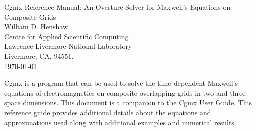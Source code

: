 \documentclass{article}
\begin{document}


\def\ud     {{    U}}
\def\pd     {{    P}}

\newcommand{\mbar}{\bar{m}}
\newcommand{\Rbar}{\bar{R}}
\newcommand{\Ru}{R_u}         %
\newcommand{\Div}{\grad\cdot}
\newcommand{\tauv}{\boldsymbol{\tau}}
\newcommand{\sumi}{\sum_{i=1}^n}
\newcommand{\dt}{{\Delta t}}
\newcommand{\dx}{{\Delta x}}
\newcommand{\eps}{\epsilon}

\newcommand{\Ic}{{\mathcal I}}
\newcommand{\Lc}{{\mathcal L}}
\newcommand{\Oc}{{\mathcal O}}

\baselineskip
\begin{flushleft}
{\Large
Cgmx Reference Manual: An {Overture} Solver for {Maxwell}'s Equations on Composite Grids\\
}
\vspace{2\baselineskip}
William D. Henshaw  \\
Centre for Applied Scientific Computing  \\
Lawrence Livermore National Laboratory      \\
Livermore, CA, 94551.  \\
\vspace{\baselineskip}
\today\\
\vspace{\baselineskip}

\vspace{4\baselineskip}


Cgmx is a program that can be used to solve the time-dependent Maxwell's equations
of electromagnetics on composite overlapping grids in two and three space
dimensions. This document is a companion to the Cgmx User Guide. 
This reference guide provides additional details about the equations and approximations used along
with additional examples and numerical results.

\end{flushleft}

\clearpage
\tableofcontents


\vfill\eject
\end{document}
